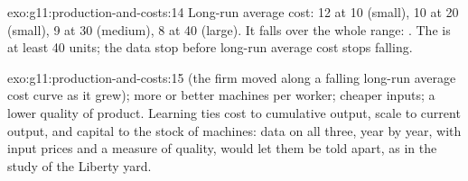 \begin{solution}{exo:g11:production-and-costs:14}
Long-run average cost: 12 at 10 (small), 10 at 20 (small), 9 at 30 (medium), 8 at 40 (large). It falls over the whole range: . The 
is at least 40 units; the data stop before long-run average cost stops falling.
\end{solution}

\begin{solution}{exo:g11:production-and-costs:15}
 (the firm moved along a falling long-run average cost curve as it grew); more or better machines per worker; cheaper inputs; a lower quality of
product. Learning ties cost to cumulative output, scale to current output, and capital to the stock of machines: data on all three, year by year, with input prices
and a measure of quality, would let them be told apart, as in the study of the Liberty yard.
\end{solution}

